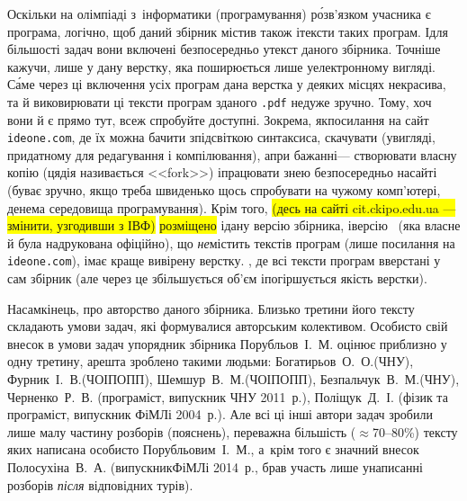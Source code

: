 Оскільки на олімпіаді з~інформатики (програмування) р\'{о}зв'язком учасника є програма, логічно, щоб даний збірник містив також і\nolinebreak[3] тексти таких програм. І\nolinebreak[3] для більшості задач вони %
\ifallIdeOneLinksCopiedHere
включені безпосередньо у\nolinebreak[3] текст даного збірника. Точніше кажучи, лише у дану верстку, яка поширюється лише у\nolinebreak[3] електронному вигляді. С\'{а}ме через ці включення усіх програм дана верстка у деяких місцях некрасива, та й виковирювати ці тексти програм з\nolinebreak[3] даного \texttt{.pdf} не\nolinebreak[3] дуже зручно. Тому, хоч вони й є прямо тут, все\nolinebreak[3] ж спробуйте
\else
доступні. Зокрема, як\nolinebreak[3] посилання на\nolinebreak[3] 
\fi
сайт \verb"ideone.com", де їх можна бачити з\nolinebreak[3] підсвіткою синтаксиса, скачувати (у\nolinebreak[3] вигляді, придатному для редагування і компілювання), а\nolinebreak[3] при бажанні\nolinebreak[3] --- створювати власну копію (ця\nolinebreak[3] дія називається <<fork>>) і\nolinebreak[3] працювати з\nolinebreak[3] нею безпосередньо на\nolinebreak[3] сайті (буває зручно, якщо треба швиденько щось спробувати на чужому комп'ютері, де\nolinebreak[3] нема середовища програмування). 
Крім того, 
\colorbox{yellow}{(десь на сайті cit.ckipo.edu.ua --- змінити, узгодивши з ІВФ)} %
\colorbox{yellow}{розміщено} і\nolinebreak[3] дану версію збірника, і\nolinebreak[3] версію%
\ifallIdeOneLinksCopiedHere%
\ (яка власне й була надрукована офіційно), що \emph{не}\nolinebreak[3] містить текстів програм (лише посилання на \verb"ideone.com"), і\nolinebreak[3] має краще вивірену верстку.
\else%
, де всі тексти програм вверстані у сам збірник (але через це збільшується об'єм і\nolinebreak[3] погіршується якість верстки).
\fi

Насамкінець, про авторство даного збірника. Близько третини його тексту складають умови задач, які формувалися авторським колективом. Особисто свій внесок в умови задач упорядник збірника Порубльов~І.~М. оцінює приблизно у одну третину, а\nolinebreak[3] решта зроблено такими людьми: Богатирьов~О.~О.\nolinebreak[3] (ЧНУ), Фурник~І.~В.\nolinebreak[3] (ЧОІПОПП), Шемшур~В.~М.\nolinebreak[3] (ЧОІПОПП), Безпальчук~В.~М.\nolinebreak[3] (ЧНУ), Черненко~Р.~В. (програміст, випускник ЧНУ 2011~р.), Поліщук~Д.~І. (фізик та програміст, випускник \mbox{ФіМЛі} 2004~р.). 
Але всі ці інші автори задач зробили лише малу частину розборів (пояснень), переважна більшість ($\approx$70--80\%) тексту яких написана особисто Порубльовим~І.~М., а~крім того є значний внесок Полосухіна~В.~А. (випускник\nolinebreak[2] \mbox{ФіМЛі} 2014~р., брав участь лише у\nolinebreak[3] написанні розборів \emph{після} відповідних турів).